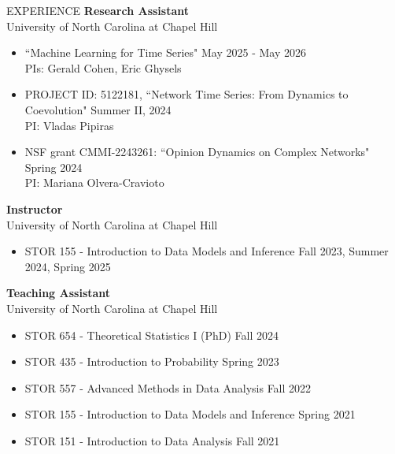 \documentclass{resume} %
\begin{document}
\begin{rSection}{EXPERIENCE}
\textbf{Research Assistant} \\ 
University of North Carolina at Chapel Hill 
\begin{itemize}
    \item ``Machine Learning for Time Series" \hfill May 2025 - May 2026 \\ 
    PIs: Gerald Cohen, Eric Ghysels
    \item PROJECT ID: 5122181, ``Network Time Series: From Dynamics to Coevolution" \hfill Summer II, 2024 \\
    PI: Vladas Pipiras
    \item NSF grant CMMI-2243261: ``Opinion Dynamics on Complex Networks" \hfill Spring 2024 \\
    PI: Mariana Olvera-Cravioto
\end{itemize}

\textbf{Instructor} \\
University of North Carolina at Chapel Hill 
\begin{itemize}
    \item STOR 155 - Introduction to Data Models and Inference \hfill Fall 2023, Summer 2024, Spring 2025
\end{itemize}

\textbf{Teaching Assistant} \\
University of North Carolina at Chapel Hill 
 \begin{itemize}
    \itemsep -3pt {} 
    \item STOR 654 - Theoretical Statistics I (PhD) \hfill Fall 2024
    \item STOR 435 - Introduction to Probability \hfill Spring 2023
     \item STOR 557 - Advanced Methods in Data Analysis \hfill Fall 2022
     \item STOR 155 - Introduction to Data Models and Inference \hfill Spring 2021
     \item STOR 151 - Introduction to Data Analysis \hfill Fall 2021
 \end{itemize}



\end{rSection}
\end{document}
